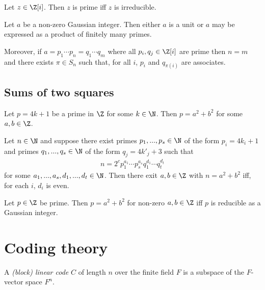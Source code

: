 \documentclass{article}
\begin{document}
\begin{theorem}[Lectures 15-16]
	Let $z\in\Z[i]$. Then $z$ is prime iff $z$ is irreducible.
\end{theorem}

\begin{theorem}
	Let $a$ be a non-zero Gaussian integer. Then either $a$ is a unit or $a$ may be expressed
	as a product of finitely many primes.

	Moreover, if $a=p_1\cdots p_n=q_1\cdots q_m$ where all $p_i,q_j\in\Z[i]$ are prime then
	$n=m$ and there exists $\pi\in S_n$ such that, for all $i$, $p_i$ and $q_{\pi(i)}$ are associates.
\end{theorem}

\subsection{Sums of two squares}

\begin{theorem}[Lectures 15-16]
	Let $p=4k+1$ be a prime in $\Z$ for some $k\in\N$. Then $p=a^2+b^2$ for some
	$a,b\in\Z$.
\end{theorem}

\begin{theorem}[Lectures 15-16]
	Let $n\in\N$ and suppose there exist primes $p_1,...,p_s\in\N$ of the form
	$p_i=4k_i+1$ and primes $q_1,...,q_s\in\N$ of the form $q_j=4k'_j+3$ such that
	\begin{align*}
		n=2^c p_1^{a_1}\cdots p_s^{a_s} q_1^{d_1}\cdots q_t^{d_t}
	\end{align*}
	for some $a_1,...,a_s,d_1,...,d_t\in\N$. Then there exit $a,b\in\Z$ with
	$n=a^2+b^2$ iff, for each $i$, $d_i$ is even.
\end{theorem}

\begin{lemma}[Lectures 15-16]
	Let $p\in\Z$ be prime. Then $p=a^2+b^2$ for non-zero $a,b\in\Z$ iff $p$ is reducible
	as a Gaussian integer.
\end{lemma}

\section{Coding theory}

\begin{definition}[Lecture 9]
	A \emph{(block) linear code} $C$ of length $n$ over the finite field $F$ is a subspace of the
	$F$-vector space $F^n$.
\end{definition}
\end{document}
